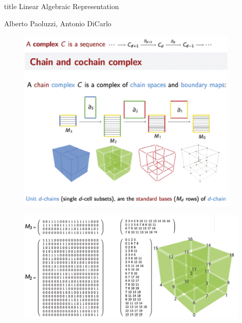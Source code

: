 \begin{frame}
\vfill
\centering

\begin{beamercolorbox}[sep=8pt,center,shadow=true,rounded=true]{title}
Linear Algebraic Representation
\end{beamercolorbox}
Alberto Paoluzzi, Antonio DiCarlo \cite{DiCarlo2014}
\vfill
    
\end{frame}

\begin{frame}
\begin{figure}
    \centering
    \includegraphics[width=0.95\textwidth]{figs/L02-chain-complex.png}
\end{figure}
    
\end{frame}

\begin{frame}
\begin{figure}
    \centering
    \includegraphics[width=\textwidth]{figs/L02-characteristic-matrices.png}
\end{figure}
    
\end{frame}

